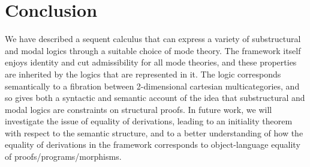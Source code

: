 \section{Conclusion}

We have described a sequent calculus that can express a variety of
substructural and modal logics through a suitable choice of mode theory.
The framework itself enjoys identity and cut admissibility for all mode
theories, and these properties are inherited by the logics that are
represented in it.  The logic corresponds semantically to a fibration
between 2-dimensional cartesian multicategories, and so gives both a
syntactic and semantic account of the idea that substructural and modal
logics are constraints on structural proofs.  In future work, we will
investigate the issue of equality of derivations, leading to an
initiality theorem with respect to the semantic structure, and to a
better understanding of how the equality of derivations in the framework
corresponds to object-language equality of proofs/programs/morphisms.

